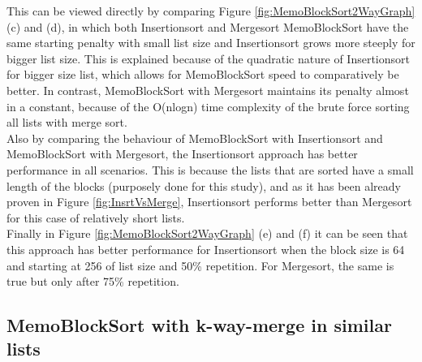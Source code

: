 \documentclass[a4paper,12pt]{article}
\begin{document}
This can be viewed directly by comparing Figure \ref{fig:MemoBlockSort2WayGraph} (c) and (d), in which both Insertionsort and Mergesort MemoBlockSort have the same starting penalty with small list size and Insertionsort grows more steeply for bigger list size. This is explained because of the quadratic nature of Insertionsort for bigger size list, which allows for MemoBlockSort speed to comparatively be better. In contrast, MemoBlockSort with Mergesort maintains its penalty almost in a constant, because of the O(nlogn) time complexity of the brute force sorting all lists with merge sort.\\

Also by comparing the behaviour of MemoBlockSort with Insertionsort and MemoBlockSort with Mergesort, the Insertionsort approach has better performance in all scenarios. This is because the lists that are sorted have a small length of the blocks (purposely done for this study), and as it has been already proven in Figure \ref{fig:InsrtVsMerge}, Insertionsort performs better than Mergesort for this case of relatively short lists.\\


Finally in Figure \ref{fig:MemoBlockSort2WayGraph} (e) and (f)  it can be seen that this approach has better performance for Insertionsort when the block size is 64 and starting at 256 of list size and 50\% repetition. For Mergesort, the same is true but only after 75\% repetition.

\subsection{MemoBlockSort with k-way-merge in similar lists}
\end{document}

